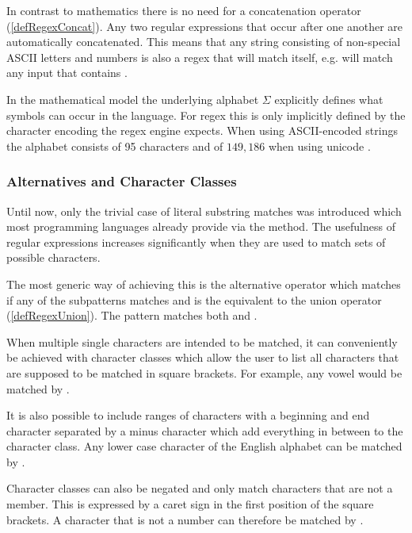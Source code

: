 In contrast to mathematics there is no need for a concatenation operator (\ref{defRegexConcat}). Any two regular expressions that occur after one another are automatically concatenated. This means that any string consisting of non-special ASCII letters and numbers is also a regex that will match itself, e.g.  will match any input that contains .

In the mathematical model the underlying alphabet $\Sigma$ explicitly defines what symbols can occur in the language. For regex this is only implicitly defined by the character encoding the regex engine expects. When using ASCII-encoded strings the alphabet consists of 95 characters \cite[p.~211~ff]{CodedCharacterSets} and of $149,186$ when using unicode \cite{UnicodeStandard15}. 

\subsubsection{Alternatives and Character Classes} \label{sec:introAltAndCharClasses}

Until now, only the trivial case of literal substring matches was introduced which most programming languages already provide via the  method. The usefulness of regular expressions increases significantly when they are used to match sets of possible characters.

The most generic way of achieving this is the alternative operator  which matches if any of the subpatterns  matches and is the equivalent to the union operator (\ref{defRegexUnion}). The pattern  matches both  and . 

When multiple single characters are intended to be matched, it can conveniently be achieved with character classes which allow the user to list all characters that are supposed to be matched in square brackets. For example, any vowel would be matched by \pattern{[aeiou]}. 

It is also possible to include ranges of characters with a beginning and end character separated by a minus character which add everything in between to the character class. Any lower case character of the English alphabet can be matched by \pattern{[a-z]}.

Character classes can also be negated and only match characters that are not a member. This is expressed by a caret sign in the first position of the square brackets. A character that is not a number can therefore be matched by \pattern{[\caret 0-9]}.

